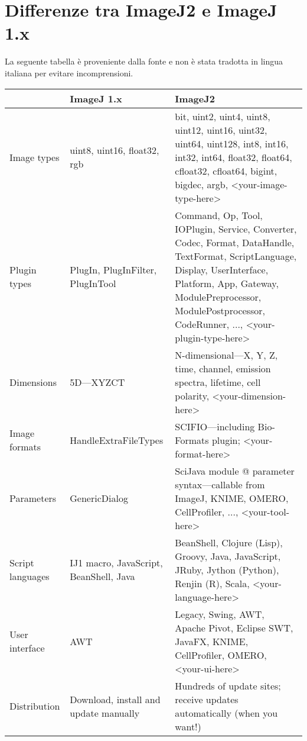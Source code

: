 \section{Differenze tra ImageJ2 e ImageJ 1.x}
\noindent La seguente tabella è proveniente dalla fonte \cite{} e non è stata tradotta in lingua italiana per evitare incomprensioni.
\begin{table}[H]
\begin{tabularx}{\textwidth}{|l|X|X|}
\hline
\small{} &
\small{ImageJ 1.x} & 
\small{ImageJ2} \\
\hline
Image types & uint8, uint16, float32, rgb &	bit, uint2, uint4, uint8, uint12, uint16, uint32, uint64, uint128, int8, int16, int32, int64, float32, float64, cfloat32, cfloat64, bigint, bigdec, argb, <your-image-type-here> \\
\hline
Plugin types & PlugIn, PlugInFilter, PlugInTool & Command, Op, Tool, IOPlugin, Service, Converter, Codec, Format, DataHandle, TextFormat, ScriptLanguage, Display, UserInterface, Platform, App, Gateway, ModulePreprocessor, ModulePostprocessor, CodeRunner, ..., <your-plugin-type-here> \\
\hline
Dimensions & 5D—XYZCT &	N-dimensional—X, Y, Z, time, channel, emission spectra, lifetime, cell polarity, <your-dimension-here> \\
\hline
Image formats & HandleExtraFileTypes & SCIFIO—including Bio-Formats plugin; <your-format-here> \\
\hline
Parameters & GenericDialog & SciJava module @ parameter syntax—callable from ImageJ, KNIME, OMERO, CellProfiler, ..., <your-tool-here> \\
\hline
Script languages & IJ1 macro, JavaScript, BeanShell, Java &	BeanShell, Clojure (Lisp), Groovy, Java, JavaScript, JRuby, Jython (Python), Renjin (R), Scala, <your-language-here>\\
\hline
User interface & AWT & Legacy, Swing, AWT, Apache Pivot, Eclipse SWT, JavaFX, KNIME, CellProfiler, OMERO, <your-ui-here> \\
\hline
Distribution & Download, install and update manually & Hundreds of update sites; receive updates automatically (when you want!) \\
\hline
\end{tabularx}
\end{table}

